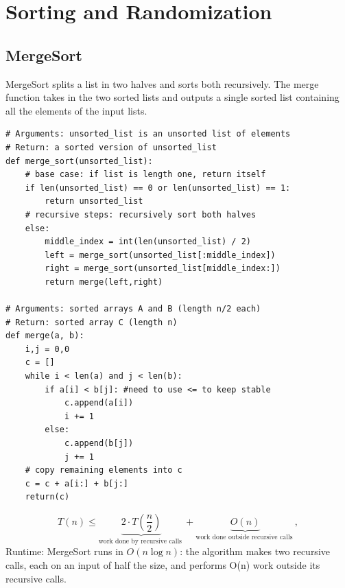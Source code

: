 \documentclass[12pt]{article}
\begin{document}
\section{Sorting and Randomization}
\subsection*{MergeSort}
MergeSort splits a list in two halves and sorts both recursively. The merge function takes in the two sorted lists and outputs a single sorted list containing all the elements of the input lists.
 \begin{mdframed}
    \begin{verbatim}
# Arguments: unsorted_list is an unsorted list of elements
# Return: a sorted version of unsorted_list
def merge_sort(unsorted_list):
    # base case: if list is length one, return itself
    if len(unsorted_list) == 0 or len(unsorted_list) == 1:
        return unsorted_list
    # recursive steps: recursively sort both halves
    else:
        middle_index = int(len(unsorted_list) / 2)
        left = merge_sort(unsorted_list[:middle_index])
        right = merge_sort(unsorted_list[middle_index:])
        return merge(left,right)
    
# Arguments: sorted arrays A and B (length n/2 each)
# Return: sorted array C (length n)
def merge(a, b):
    i,j = 0,0
    c = []
    while i < len(a) and j < len(b):
        if a[i] < b[j]: #need to use <= to keep stable
            c.append(a[i])
            i += 1
        else:
            c.append(b[j])
            j += 1
    # copy remaining elements into c
    c = c + a[i:] + b[j:]
    return(c)
    \end{verbatim}
\end{mdframed}
$$
T(n) \leq \underbrace{2 \cdot T\left(\frac{n}{2}\right)}_{\text {work done by recursive calls }}+\underbrace{O(n)}_{\text {work done outside recursive calls }},
$$
Runtime: MergeSort runs in $O(n \log n)$: the algorithm makes two recursive calls, each on an input of half the size, and performs O(n) work outside its recursive calls.
\end{document}
